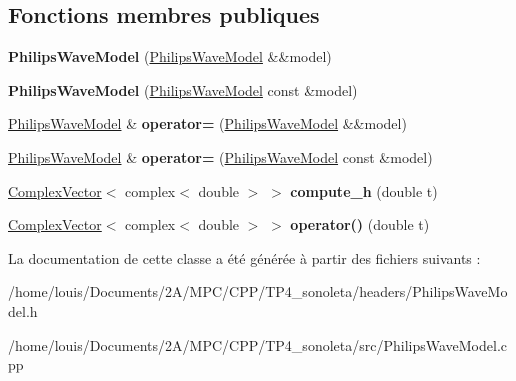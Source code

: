 \subsection*{Fonctions membres publiques}
\begin{DoxyCompactItemize}
\item 
\mbox{\label{class_philips_wave_model_af7d8e1c33f38a72f4d676077a19cfbc5}} 
{\bfseries Philips\+Wave\+Model} (\hyperlink{class_philips_wave_model}{Philips\+Wave\+Model} \&\&model)
\item 
\mbox{\label{class_philips_wave_model_aea64696ac943afe8952ea401c954236e}} 
{\bfseries Philips\+Wave\+Model} (\hyperlink{class_philips_wave_model}{Philips\+Wave\+Model} const \&model)
\item 
\mbox{\label{class_philips_wave_model_a605fbc40c74a9fc4c2d461a33d441b6c}} 
\hyperlink{class_philips_wave_model}{Philips\+Wave\+Model} \& {\bfseries operator=} (\hyperlink{class_philips_wave_model}{Philips\+Wave\+Model} \&\&model)
\item 
\mbox{\label{class_philips_wave_model_a396de399ac5a72bd09bf3dc583ddce1e}} 
\hyperlink{class_philips_wave_model}{Philips\+Wave\+Model} \& {\bfseries operator=} (\hyperlink{class_philips_wave_model}{Philips\+Wave\+Model} const \&model)
\item 
\mbox{\label{class_philips_wave_model_ae973584a7a495c53df068f474d6011fe}} 
\hyperlink{class_complex_vector}{Complex\+Vector}$<$ complex$<$ double $>$ $>$ {\bfseries compute\+\_\+h} (double t)
\item 
\mbox{\label{class_philips_wave_model_a22e8f78471a8da52b7076d61a001e6b6}} 
\hyperlink{class_complex_vector}{Complex\+Vector}$<$ complex$<$ double $>$ $>$ {\bfseries operator()} (double t)
\end{DoxyCompactItemize}


La documentation de cette classe a été générée à partir des fichiers suivants \+:\begin{DoxyCompactItemize}
\item 
/home/louis/\+Documents/2\+A/\+M\+P\+C/\+C\+P\+P/\+T\+P4\+\_\+sonoleta/headers/Philips\+Wave\+Model.\+h\item 
/home/louis/\+Documents/2\+A/\+M\+P\+C/\+C\+P\+P/\+T\+P4\+\_\+sonoleta/src/Philips\+Wave\+Model.\+cpp\end{DoxyCompactItemize}
